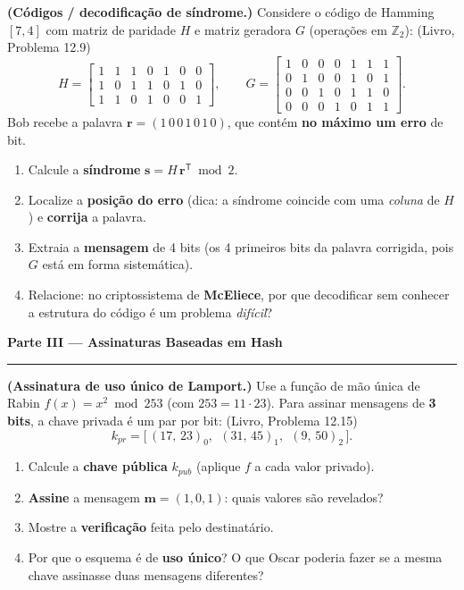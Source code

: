 \documentclass[11pt,a4paper]{article}
\newcommand{\livro}[1]{{\footnotesize\color{black!50}(Livro, Problema #1)}}
\newcommand{\parte}[1]{%
    \par\vspace{1.6em}\noindent
    {\large\bfseries\color{red!55!black}#1}%
    \par\nobreak\vspace{-0.4em}\noindent
    {\color{red!45!black}\rule{\linewidth}{1.0pt}}%
    \par\nobreak\vspace{0.2em}
}
\begin{document}
\begin{exercicio}
\textbf{(C\'{o}digos / decodifica\c{c}\~{a}o de s\'{i}ndrome.)} Considere o c\'{o}digo de Hamming $[7,4]$ com matriz de paridade $H$ e matriz geradora $G$ (opera\c{c}\~{o}es em $\mathbb{Z}_2$): \livro{12.9}
\[
H=\begin{bmatrix}1&1&1&0&1&0&0\\1&0&1&1&0&1&0\\1&1&0&1&0&0&1\end{bmatrix},
\qquad
G=\begin{bmatrix}1&0&0&0&1&1&1\\0&1&0&0&1&0&1\\0&0&1&0&1&1&0\\0&0&0&1&0&1&1\end{bmatrix}.
\]
Bob recebe a palavra $\mathbf{r} = (1\,0\,0\,1\,0\,1\,0)$, que cont\'{e}m \textbf{no m\'{a}ximo um erro} de bit.
\begin{enumerate}[label=(\alph*)]
    \item Calcule a \textbf{s\'{i}ndrome} $\mathbf{s} = H\,\mathbf{r}^{\mathsf T} \bmod 2$.
    \item Localize a \textbf{posi\c{c}\~{a}o do erro} (dica: a s\'{i}ndrome coincide com uma \emph{coluna} de $H$) e \textbf{corrija} a palavra.
    \item Extraia a \textbf{mensagem} de 4 bits (os 4 primeiros bits da palavra corrigida, pois $G$ est\'{a} em forma sistem\'{a}tica).
    \item Relacione: no criptossistema de \textbf{McEliece}, por que decodificar sem conhecer a estrutura do c\'{o}digo \'{e} um problema \emph{dif\'{i}cil}?
\end{enumerate}
\end{exercicio}

\parte{Parte III --- Assinaturas Baseadas em Hash}

\begin{exercicio}
\textbf{(Assinatura de uso \'{u}nico de Lamport.)} Use a fun\c{c}\~{a}o de m\~{a}o \'{u}nica de Rabin $f(x) = x^2 \bmod 253$ (com $253 = 11 \cdot 23$). Para assinar mensagens de \textbf{3 bits}, a chave privada \'{e} um par por bit: \livro{12.15}
\[
k_{pr} = \big[\,(17,\,23)_0,\ \ (31,\,45)_1,\ \ (9,\,50)_2\,\big].
\]
\begin{enumerate}[label=(\alph*)]
    \item Calcule a \textbf{chave p\'{u}blica} $k_{pub}$ (aplique $f$ a cada valor privado).
    \item \textbf{Assine} a mensagem $\mathbf{m} = (1,0,1)$: quais valores s\~{a}o revelados?
    \item Mostre a \textbf{verifica\c{c}\~{a}o} feita pelo destinat\'{a}rio.
    \item Por que o esquema \'{e} de \textbf{uso \'{u}nico}? O que Oscar poderia fazer se a mesma chave assinasse duas mensagens diferentes?
\end{enumerate}
\end{exercicio}
\end{document}
